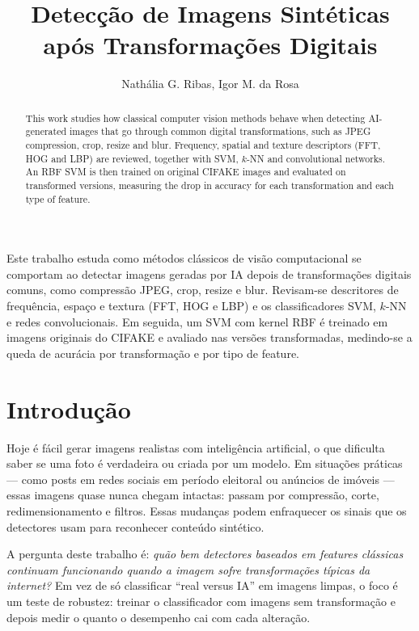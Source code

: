 \documentclass[12pt]{article}
\title{Detecção de Imagens Sintéticas após Transformações Digitais}
\author{Nathália G. Ribas\inst{1}, Igor M. da Rosa\inst{1}}
\begin{document}
\maketitle

\begin{abstract}
This work studies how classical computer vision methods behave when detecting AI-generated images that go through common digital transformations, such as JPEG compression, crop, resize and blur. Frequency, spatial and texture descriptors (FFT, HOG and LBP) are reviewed, together with SVM, $k$-NN and convolutional networks. An RBF SVM is then trained on original CIFAKE images and evaluated on transformed versions, measuring the drop in accuracy for each transformation and each type of feature.
\end{abstract}

\begin{resumo}
Este trabalho estuda como métodos clássicos de visão computacional se comportam ao detectar imagens geradas por IA depois de transformações digitais comuns, como compressão JPEG, crop, resize e blur. Revisam-se descritores de frequência, espaço e textura (FFT, HOG e LBP) e os classificadores SVM, $k$-NN e redes convolucionais. Em seguida, um SVM com kernel RBF é treinado em imagens originais do CIFAKE e avaliado nas versões transformadas, medindo-se a queda de acurácia por transformação e por tipo de feature.
\end{resumo}

\section{Introdução}

Hoje é fácil gerar imagens realistas com inteligência artificial, o que dificulta saber se uma foto é verdadeira ou criada por um modelo. Em situações práticas --- como posts em redes sociais em período eleitoral ou anúncios de imóveis --- essas imagens quase nunca chegam intactas: passam por compressão, corte, redimensionamento e filtros. Essas mudanças podem enfraquecer os sinais que os detectores usam para reconhecer conteúdo sintético.

A pergunta deste trabalho é: \emph{quão bem detectores baseados em features clássicas continuam funcionando quando a imagem sofre transformações típicas da internet?} Em vez de só classificar ``real versus IA'' em imagens limpas, o foco é um teste de robustez: treinar o classificador com imagens sem transformação e depois medir o quanto o desempenho cai com cada alteração.
\end{document}
